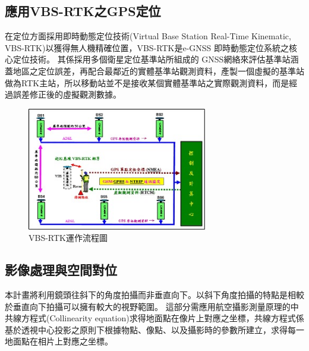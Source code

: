 \documentclass[12pt]{article}       %
\renewcommand{\figurename}{圖}                           %
\begin{document}
\subsection{應用VBS-RTK之GPS定位}
\hspace{2em}在定位方面採用即時動態定位技術(Virtual Base Station Real-Time Kinematic, VBS-RTK)以獲得無人機精確位置，VBS-RTK是e-GNSS 即時動態定位系統之核心定位技術。
其係採用多個衛星定位基準站所組成的 GNSS網絡來評估基準站涵蓋地區之定位誤差，再配合最鄰近的實體基準站觀測資料，產製一個虛擬的基準站做為RTK主站，所以移動站並不是接收某個實體基準站之實際觀測資料，而是經過誤差修正後的虛擬觀測數據。

\begin{figure}[htbp]
    \centering
    \renewcommand{\figurename}{圖}                              %
    \includegraphics[width=0.7\textwidth]{vbsrtk.jpg}         %
    \caption{VBS-RTK運作流程圖\cite{egnss_2020}}           %
    \label{fig:vbsrtk}                                        %
\end{figure}

\subsection{影像處理與空間對位}
\hspace{2em}本計畫將利用鏡頭往斜下的角度拍攝而非垂直向下。以斜下角度拍攝的特點是相較於垂直向下拍攝可以擁有較大的視野範圍。
這部分需應用航空攝影測量原理\cite{zhao2013}的中共線方程式(Collinearity equation)求得地面點在像片上對應之坐標，共線方程式係基於透視中心投影之原則下根據物點、像點、以及攝影時的參數所建立，求得每一地面點在相片上對應之坐標。
\end{document}
